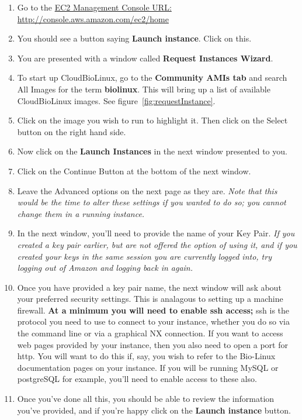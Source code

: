 \begin{enumerate}
\item Go to the \href{http://console.aws.amazon.com/ec2/home}{EC2 Management Console URL: http://console.aws.amazon.com/ec2/home}
\item You should see a button saying \textbf{Launch instance}. Click on this. 
\item You are presented with a window called \textbf{Request Instances Wizard}. 
\item To start up CloudBioLinux, go to the \textbf{Community AMIs tab} and search All Images for the term \textbf{biolinux}. This will bring up a list of available CloudBioLinux images. See figure~\ref{fig:requestInstance}.
\item Click on the image you wish to run to highlight it. Then click on the Select button on the right hand side. 
\item Now click on the \textbf{Launch Instances} in the next window presented to you.
\item Click on the Continue Button at the bottom of the next window. 
\item Leave the Advanced options on the next page as they are. \emph{Note that this would be the time to alter these settings if you wanted to do so; you cannot change them in a running instance.}
\item In the next window, you'll need to provide the name of your Key Pair. \emph{If you created a key pair earlier, but are not offered the option of using it, and if you created your keys in the same session you are currently logged into, try logging out of Amazon and logging back in again.}
\item Once you have provided a key pair name, the next window will ask about your preferred security settings. This is analagous to setting up a machine firewall. \textbf{At a minimum you will need to enable ssh access;} ssh is the protocol you need to use to connect to your instance, whether you do so via the command line or via a graphical NX connection. If you want to access web pages provided by your instance, then you also need to open a port for http. You will want to do this if, say, you wish to refer to the Bio-Linux documentation pages on your instance. If you will be running MySQL or postgreSQL for example, you'll need to enable access to these also.
\item Once you've done all this, you should be able to review the information you've provided, and if you're happy click on the \textbf{Launch instance} button.
\end{enumerate}

